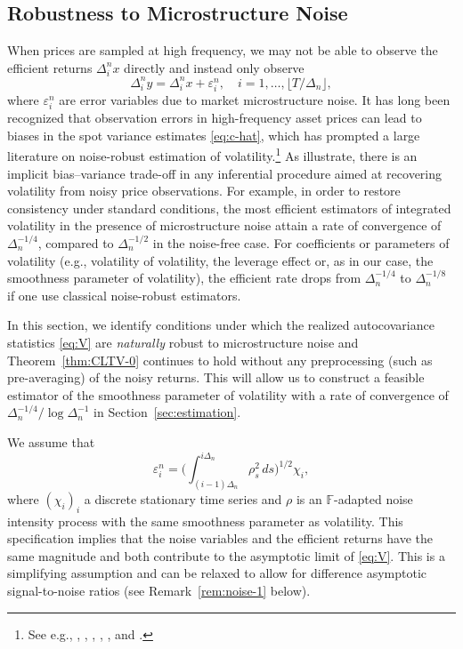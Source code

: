 \documentclass[ecta,nameyear,draft]{econsocart}
\newcommand{\1}{\mathbf 1}
\numberwithin{equation}{section}
\newcommand{\F}{\mathbb{F}}
\newcommand{\Den}{\Delta_n}
\begin{document}
\subsection{Robustness to Microstructure Noise}\label{sec:noise}

When prices are sampled at high frequency, we may not be able to observe the efficient returns $\Delta^n_i x$ directly and instead only observe
\begin{equation}\label{eq:y} 
	\Delta^n_i y=\Delta^n_i x+\varepsilon^n_i,\quad i=1,\ldots,\lfloor T/\Delta_n\rfloor,
\end{equation}
where $\varepsilon^n_i$ are error variables due to market microstructure noise. It has long been recognized that
observation errors in high-frequency asset prices can lead to  biases in the spot variance estimates  \eqref{eq:c-hat}, which has prompted a large literature  on noise-robust estimation of volatility.\footnote{See e.g., \cite{BR06}, \cite{barndorff2008designing}, \cite{jacod2009microstructure}, \cite{zhang2005tale}, \cite{jacod2017statistical}, \cite{da2021moving} and \cite{li2022remedi}.} As \cite{BR08} illustrate, there is an implicit bias--variance trade-off in any inferential procedure aimed at recovering volatility from noisy price observations. For example, in order to restore consistency under standard conditions, the most efficient estimators of integrated volatility in the presence of microstructure noise attain a rate of convergence of $\Den^{-1/4}$, compared to $\Den^{-1/2}$ in the noise-free case. For coefficients or parameters of volatility (e.g., volatility of volatility, the leverage effect or, as in our case, the smoothness parameter of volatility), the efficient rate drops from $\Den^{-1/4}$ to  $\Den^{-1/8}$ if one use classical noise-robust estimators.


In this section, we identify conditions under which the realized autocovariance statistics \eqref{eq:V} are \emph{naturally} robust to microstructure noise and Theorem~\ref{thm:CLTV-0} continues to hold without any preprocessing (such as pre-averaging) of the noisy returns. This will allow us to construct a feasible estimator of the smoothness parameter of volatility with a rate of convergence of $\Den^{-1/4}/\log \Den^{-1}$ in Section~\ref{sec:estimation}.

We assume that
\begin{equation}
	\label{eq:noise}
	\varepsilon_i^n = \Big( \int_{(i-1)\Delta_n}^{i\Delta_n} \rho_{s}^2 \, ds\Big)^{1/2}  \chi_i,
\end{equation}
where $(\chi_i)_i$ a discrete stationary time series  and $\rho$ is an $\F$-adapted noise intensity process with the same smoothness parameter as volatility. This  specification implies that the noise variables and the efficient returns have the same magnitude and both contribute to the asymptotic limit of \eqref{eq:V}. This is a simplifying assumption and can be relaxed to allow for difference asymptotic signal-to-noise ratios   (see  Remark~\ref{rem:noise-1} below).
\end{document}
